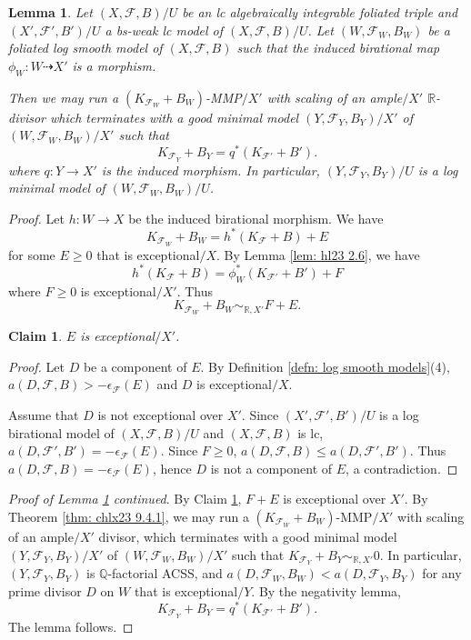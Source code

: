 \documentclass[11pt]{amsart}
\numberwithin{equation}{section}
\newcommand{\Qq}{\mathbb{Q}}
\newcommand{\Rr}{\mathbb{R}}
\newcommand{\Ff}{\mathcal{F}}
\newtheorem{lem}[thm]{Lemma}
\newtheorem{claim}[thm]{Claim}
\theoremstyle{definition}
\theoremstyle{definition}
\theoremstyle{definition}
\begin{document}
\begin{lem}\label{lem: foliation lsm has lmm}
Let $(X,\Ff,B)/U$ be an lc algebraically integrable foliated triple and $(X',\Ff',B')/U$ a bs-weak lc model of $(X,\Ff,B)/U$. Let $(W,\Ff_W,B_W)$ be a foliated log smooth model of $(X,\Ff,B)$ such that the induced birational map $\phi_W: W\dashrightarrow X'$ is a morphism. 

Then we may run a $(K_{\Ff_W}+B_W)$-MMP$/X'$ with scaling of an ample$/X'$ $\Rr$-divisor which terminates with a good minimal model $(Y,\Ff_Y,B_Y)/X'$ of $(W,\Ff_W,B_W)/X'$ such that $$K_{\Ff_Y}+B_Y=q^*(K_{\Ff'}+B').$$
where $q: Y\rightarrow X'$ is the induced morphism. In particular, $(Y,\Ff_Y,B_Y)/U$ is a log minimal model of $(W,\Ff_W,B_W)/U$.
\end{lem}
\begin{proof}
    Let $h: W\rightarrow X$ be the induced birational morphism. We have
    $$K_{\Ff_W}+B_W=h^*(K_\Ff+B)+E$$
for some $E\geq 0$ that is exceptional$/X$. By Lemma \ref{lem: hl23 2.6}, we have
$$h^*(K_{\Ff}+B)=\phi_W^*(K_{\Ff'}+B')+F$$
where $F\geq 0$ is exceptional$/X'$. Thus
$$K_{\Ff_W}+B_W\sim_{\mathbb R,X'}F+E.$$
\begin{claim}\label{claim: wglc to lmm E exceptional}
$E$ is exceptional$/X'$.
\end{claim}
\begin{proof}
Let $D$ be a component of $E$. By Definition \ref{defn: log smooth models}(4), $a(D,\Ff,B)>-\epsilon_{\Ff}(E)$ and $D$ is exceptional$/X$. 

Assume that $D$ is not exceptional over $X'$. Since $(X',\Ff',B')/U$ is a log birational model of $(X,\Ff,B)/U$ and $(X,\Ff,B)$ is lc, $a(D,\Ff',B')=-\epsilon_{\Ff}(E)$. Since $F\geq 0$, $a(D,\Ff,B)\leq a(D,\Ff',B')$. Thus $a(D,\Ff,B)=-\epsilon_{\Ff}(E)$, hence $D$ is not a component of $E$, a contradiction.
\end{proof}
\noindent\textit{Proof of Lemma \ref{lem: foliation lsm has lmm} continued}. By Claim \ref{claim: wglc to lmm E exceptional}, $F+E$ is exceptional over $X'$. By Theorem \ref{thm: chlx23 9.4.1}, we may run a $(K_{\Ff_W}+B_W)$-MMP$/X'$ with scaling of an ample$/X'$ divisor, which terminates with a good minimal model $(Y,\Ff_Y,B_Y)/X'$ of $(W,\Ff_W,B_W)/X'$ such that $K_{\Ff_Y}+B_Y\sim_{\Rr,X'}0$. In particular, $(Y,\Ff_Y,B_Y)$ is $\Qq$-factorial ACSS, and $a(D,\Ff_W,B_W)<a(D,\Ff_Y,B_Y)$ for any prime divisor $D$ on $W$ that is exceptional$/Y$. By the negativity lemma, 
$$K_{\Ff_Y}+B_Y=q^*(K_{\Ff'}+B').$$ 
The lemma follows.
\end{proof}
\end{document}
